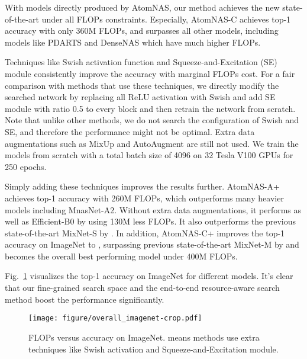 \documentclass{article} \usepackage{iclr2020_conference,times}
\newcommand{\flops}{FLOPs\xspace}
\begin{document}
With models directly produced by AtomNAS, our method achieves the new state-of-the-art under all \flops constraints. Especially, AtomNAS-C achieves  top-1 accuracy with only 360M \flops, and surpasses all other models, including models like PDARTS and DenseNAS which have much higher \flops.



Techniques like Swish activation function \citep{ramachandran2018swish} and Squeeze-and-Excitation (SE) module \citep{hu2018se} consistently improve the accuracy with marginal \flops cost. For a fair comparison with methods that use these techniques, we directly modify the searched network by replacing all ReLU activation with Swish and add SE module with ratio 0.5 to every block and then retrain the network from scratch. Note that unlike other methods, we do not search the configuration of Swish and SE, and therefore the performance might not be optimal. Extra data augmentations such as MixUp and AutoAugment are still not used. We train the models from scratch with a total batch size of 4096 on 32 Tesla V100 GPUs for 250 epochs. 


Simply adding these techniques improves the results further. AtomNAS-A+ achieves  top-1 accuracy with 260M \flops, which outperforms many heavier models including MnasNet-A2. Without extra data augmentations, it performs as well as Efficient-B0 \citep{mingxing2019efficient} by using 130M less \flops. It also outperforms the previous state-of-the-art MixNet-S by . In addition, AtomNAS-C+ improves the top-1 accuracy on ImageNet to , surpassing previous state-of-the-art MixNet-M by  and becomes the overall best performing model under 400M \flops.


Fig.~\ref{fig:overall_imagenet} visualizes the top-1 accuracy on ImageNet for different models. It's clear that our fine-grained search space and the end-to-end resource-aware search method boost the performance significantly.

\begin{figure}[t]
    \centering
    \texttt{[image: figure/overall\_imagenet-crop.pdf]}
    \caption{\flops versus accuracy on ImageNet.  means methods use extra techniques like Swish activation and Squeeze-and-Excitation module.}
    \label{fig:overall_imagenet}
\end{figure}
\end{document}
